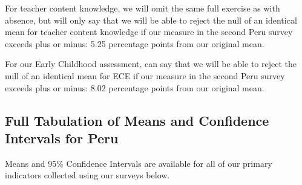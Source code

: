 \documentclass[]{article}
\begin{document}
For teacher content knowledge, we will omit the same full exercise as
with absence, but will only say that we will be able to reject the null
of an identical mean for teacher content knowledge if our measure in the
second Peru survey exceeds plus or minus: 5.25 percentage points from
our original mean.

For our Early Childhood assessment, can say that we will be able to
reject the null of an identical mean for ECE if our measure in the
second Peru survey exceeds plus or minus: 8.02 percentage points from
our original mean.

\hypertarget{full-tabulation-of-means-and-confidence-intervals-for-peru}{%
\subsection{Full Tabulation of Means and Confidence Intervals for
Peru}\label{full-tabulation-of-means-and-confidence-intervals-for-peru}}

Means and 95\% Confidence Intervals are available for all of our primary
indicators collected using our surveys below.
\end{document}
